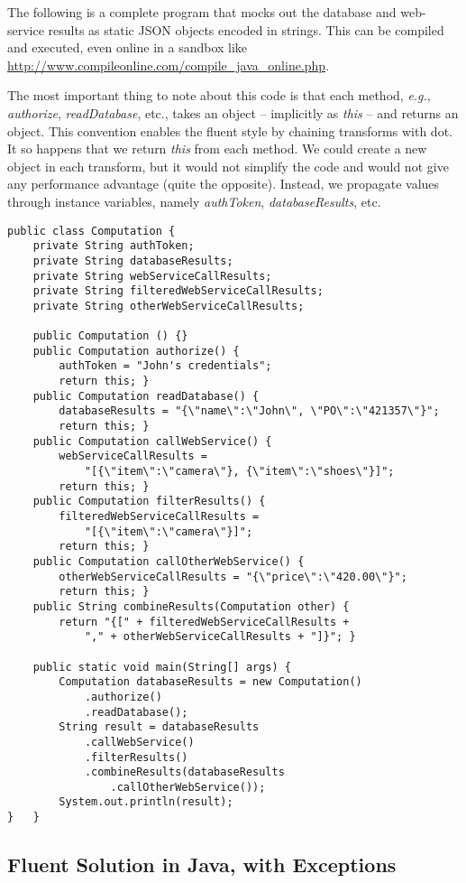 \documentclass[11pt]{article}
\begin{document}
The following is a complete program that mocks out the database and
web-service results as static JSON objects encoded in strings. This
can be compiled and executed, even online in a sandbox like
\url{http://www.compileonline.com/compile_java_online.php}.

The most important thing to note about this code is that each
method, \emph{e.g.}, \emph{authorize}, \emph{readDatabase}, etc., takes an object
-- implicitly as \emph{this} -- and returns an object. This convention
enables the fluent style by chaining transforms with dot. It so
happens that we return \emph{this} from each method. We could create a
new object in each transform, but it would not simplify the code and
would not give any performance advantage (quite the opposite).
Instead, we propagate values through instance variables, namely
\emph{authToken}, \emph{databaseResults}, etc.
\begin{verbatim}
public class Computation {
    private String authToken;
    private String databaseResults;
    private String webServiceCallResults;
    private String filteredWebServiceCallResults;
    private String otherWebServiceCallResults;

    public Computation () {}
    public Computation authorize() {
        authToken = "John's credentials";
        return this; }
    public Computation readDatabase() {
        databaseResults = "{\"name\":\"John\", \"PO\":\"421357\"}";
        return this; }
    public Computation callWebService() {
        webServiceCallResults =
            "[{\"item\":\"camera\"}, {\"item\":\"shoes\"}]";
        return this; }
    public Computation filterResults() {
        filteredWebServiceCallResults =
            "[{\"item\":\"camera\"}]";
        return this; }
    public Computation callOtherWebService() {
        otherWebServiceCallResults = "{\"price\":\"420.00\"}";
        return this; }
    public String combineResults(Computation other) {
        return "{[" + filteredWebServiceCallResults +
            "," + otherWebServiceCallResults + "]}"; }

    public static void main(String[] args) {
        Computation databaseResults = new Computation()
            .authorize()
            .readDatabase();
        String result = databaseResults
            .callWebService()
            .filterResults()
            .combineResults(databaseResults
                .callOtherWebService());
        System.out.println(result);
}   }
\end{verbatim}
\subsection{Fluent Solution in Java, with Exceptions}
\label{sec-2-2}
\end{document}
